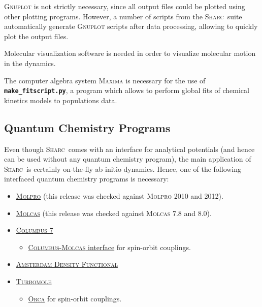 \documentclass[a4paper,11pt,DIV=15,openany,twoside=false]{scrbook}
\newcommand{\sharc}{\textsc{Sharc}}
\newcommand{\ttt}[1]{\textbf{\texttt{#1}}}
\begin{document}
\textsc{Gnuplot} is not strictly necessary, since all output files could be plotted using other plotting programs. However, a number of scripts from the \sharc\ suite automatically generate \textsc{Gnuplot} scripts after data processing, allowing to quickly plot the output files.

Molecular visualization software is needed in order to visualize molecular motion in the dynamics.

The computer algebra system \textsc{Maxima} is necessary for the use of \ttt{make\_fitscript.py}, a program which allows to perform global fits of chemical kinetics models to populations data.

\subsection{Quantum Chemistry Programs}

Even though \sharc\ comes with an interface for analytical potentials (and hence can be used without any quantum chemistry program), the main application of \sharc\ is certainly on-the-fly ab initio dynamics. Hence, one of the following interfaced quantum chemistry programs is necessary:
\begin{itemize}
  \item \href{http://www.molpro.net/}{\textsc{Molpro}} (this release was checked against \textsc{Molpro} 2010 and 2012).
  \item \href{http://http://molcas.org/}{\textsc{Molcas}} (this release was checked against \textsc{Molcas} 7.8 and 8.0).
  \item \href{http://www.univie.ac.at/columbus/docs_COL70/documentation_main.html}{\textsc{Columbus} 7}
  \begin{itemize}
    \item \href{http://www.univie.ac.at/columbus/docs_COL70/columbus_molcas_link.html}{\textsc{Columbus-Molcas} interface} for spin-orbit couplings.
  \end{itemize}
  \item \href{http://www.scm.com/ADF}{\textsc{Amsterdam Density Functional}}
  \item \href{http://www.turbomole.com}{\textsc{Turbomole}}
  \begin{itemize}
    \item \href{http://orcaforum.cec.mpg.de}{\textsc{Orca}} for spin-orbit couplings.
  \end{itemize}
\end{itemize}
\end{document}
